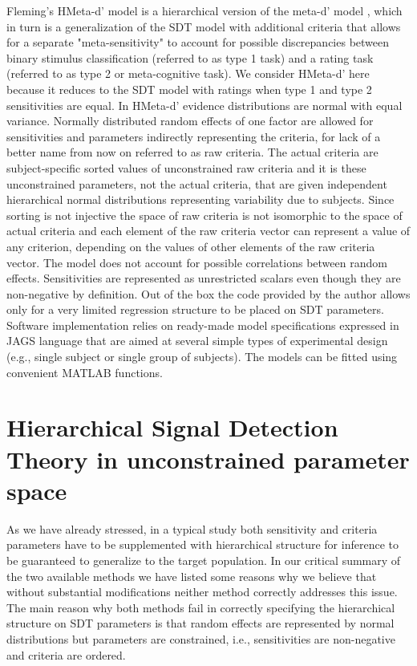 \documentclass[oneside,a4paper]{article}
\begin{document}
Fleming's \citeyear{hmetad} HMeta-d' model is a hierarchical version
of the meta-d' model \cite{maniscalco2012signal}, which in turn is a
generalization of the SDT model with additional criteria that allows
for a separate "meta-sensitivity" to account for possible
discrepancies between binary stimulus classification (referred to as
type 1 task) and a rating task (referred to as type 2 or
meta-cognitive task). We consider HMeta-d' here because it reduces to
the SDT model with ratings when type 1 and type 2 sensitivities are
equal. In HMeta-d' evidence distributions are normal with equal
variance. Normally distributed random effects of one factor are
allowed for sensitivities and parameters indirectly representing the
criteria, for lack of a better name from now on referred to as raw
criteria. The actual criteria are subject-specific sorted values of
unconstrained raw criteria and it is these unconstrained parameters,
not the actual criteria, that are given independent hierarchical
normal distributions representing variability due to subjects. Since
sorting is not injective the space of raw criteria is not isomorphic
to the space of actual criteria and each element of the raw criteria
vector can represent a value of any criterion, depending on the values
of other elements of the raw criteria vector. The model does not
account for possible correlations between random
effects. Sensitivities are represented as unrestricted scalars even
though they are non-negative by definition. Out of the box the code
provided by the author allows only for a very limited regression
structure to be placed on SDT parameters. Software implementation
relies on ready-made model specifications expressed in JAGS language
that are aimed at several simple types of experimental design (e.g.,
single subject or single group of subjects). The models can be fitted
using convenient MATLAB functions.

\section{Hierarchical Signal Detection Theory in unconstrained
  parameter space}

As we have already stressed, in a typical study both sensitivity and
criteria parameters have to be supplemented with hierarchical
structure for inference to be guaranteed to generalize to the target
population. In our critical summary of the two available methods we
have listed some reasons why we believe that without substantial
modifications neither method correctly addresses this issue. The main
reason why both methods fail in correctly specifying the hierarchical
structure on SDT parameters is that random effects are represented by
normal distributions but parameters are constrained, i.e.,
sensitivities are non-negative and criteria are ordered.
\end{document}
